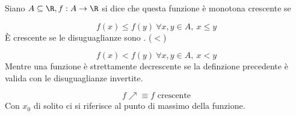 \documentclass[../analisi.tex]{subfiles}
\begin{document}
\begin{defn}
Siano $\acr, f: A \to \R$ si dice che questa funzione è monotona crescente se

\begin{equation}
	f(x) \leq f(y)\ \forall x,y \in A,\ x \leq y
\end{equation}
È  crescente se le disuguaglianze sono . ($<$)

\begin{equation}
	f(x) < f(y)\ \forall x,y \in A,\ x < y
\end{equation}
Mentre una funzione è strettamente decrescente se la definzione precedente è valida
con le disuguaglianze invertite.
\end{defn}

\begin{equation}
	f \nearrow \equiv f\text{ crescente}
\end{equation}
Con $x_0$ di solito ci si riferisce al punto di massimo della funzione.
\end{document}
